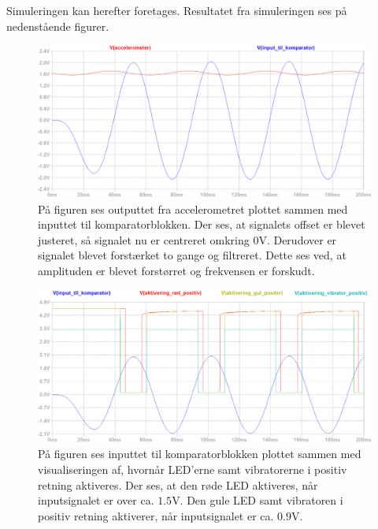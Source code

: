 \noindent Simuleringen kan herefter foretages. Resultatet fra simuleringen ses på nedenstående figurer.
\begin{figure}[H]
	\centering
	\includegraphics[scale=.3]{figures/cProblemloesning/Samlet_system_sim12.PNG}
	\caption{På figuren ses outputtet fra accelerometret plottet sammen med inputtet til komparatorblokken. Der ses, at signalets offset er blevet justeret, så signalet nu er centreret omkring 0V. Derudover er signalet blevet forstærket to gange og filtreret. Dette ses ved, at amplituden er blevet forstørret og frekvensen er forskudt.}
	\label{fig:samlet_system_sim1}
\end{figure}
\begin{figure}[H]
	\centering
	\includegraphics[scale=.38]{figures/cProblemloesning/Samlet_system_sim3.PNG}
	\caption{På figuren ses inputtet til komparatorblokken plottet sammen med visualiseringen af, hvornår LED'erne samt vibratorerne i positiv retning aktiveres. Der ses, at den røde LED aktiveres, når inputsignalet er over ca. $1.5$V. Den gule LED samt vibratoren i positiv retning aktiverer, når inputsignalet er ca. $0.9$V.}
	\label{fig:samlet_system_sim2}
\end{figure}
